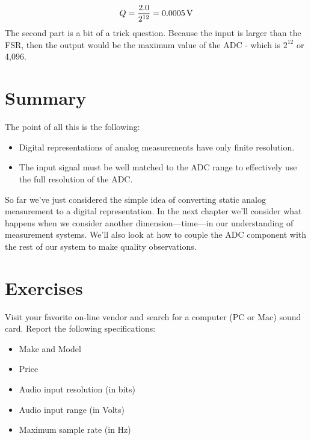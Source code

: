 \ifsolutions
\begin{soln}
\[ 
Q = \frac{2.0}{2^{12}} = \unit[0.0005]{V}
\]
The second part is a bit of a trick question.  Because the input is larger than the FSR, then the output would be the maximum value of the ADC - which is $2^{12}$ or 4,096.  
\end{soln}
\fi

\section{Summary}
The point of all this is the following:
\begin{itemize}
\item Digital representations of analog measurements have only finite resolution.
\item The input signal must be well matched to the ADC range to effectively use the full resolution of the ADC.  
\end{itemize}

So far we've just considered the simple idea of converting static analog measurement to a digital representation.  In the next chapter we'll consider what happens when we consider another dimension---time---in our understanding of measurement systems.  We'll also look at how to couple the ADC component with the rest of our system to make quality observations.

\section{Exercises}
\begin{ex}
Visit your favorite on-line vendor and search for a computer (PC or Mac) sound card.  Report the following specifications:
\begin{itemize}
\item Make and Model
\item Price
\item Audio input resolution (in bits)
\item Audio input range (in Volts)
\item Maximum sample rate (in Hz)
\end{itemize}
\end{ex}



